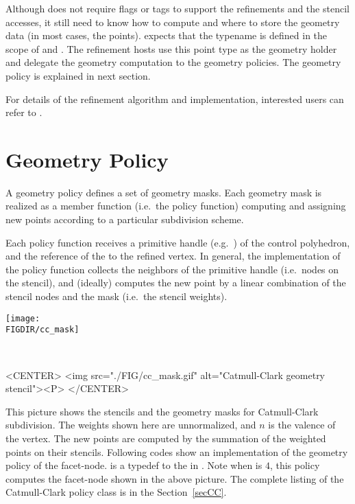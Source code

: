 Although  does not require flags or 
tags to support the refinements and the stencil accesses, it
still need to know how to compute and where to store the geometry
data (in most cases, the points).  
expects that the typename  is 
defined in the scope of  and . 
The refinement hosts use
this point type as the geometry holder and delegate the geometry
computation to the geometry policies. The geometry policy is 
explained in next section. 

For details of the refinement algorithm and implementation, 
interested users can refer to \cite{cgal:sp-mrbee-05}.

\section{Geometry Policy}
A geometry policy defines a set of geometry masks. 
Each geometry mask is realized as a member function (i.e.~the 
policy function) computing and assigning new points according 
to a particular subdivision scheme. 

Each policy function receives a primitive handle 
(e.g.~) of the control polyhedron, 
and the reference of the  to the refined vertex. 
In general, the implementation of the policy function 
collects the neighbors of the primitive handle (i.e.~nodes 
on the stencil), and (ideally) computes the new point 
by a linear combination of the stencil 
nodes and the mask (i.e.~the stencil weights).

\begin{ccTexOnly}
  \begin{center}
    \parbox{0.4\textwidth}{%
      \texttt{[image: \\FIGDIR/cc\_mask]}%
    } \\ \vspace{0.5cm}
  \end{center}
\end{ccTexOnly}
\begin{ccHtmlOnly}
  <CENTER>
     <img src="./FIG/cc_mask.gif" alt="Catmull-Clark geometry stencil"><P>
  </CENTER>
\end{ccHtmlOnly}

This picture shows the stencils and the geometry masks for
Catmull-Clark subdivision. The weights shown here are unnormalized, 
and $n$ is the valence of the vertex. The new points are 
computed by the summation of the weighted points on their stencils.
Following codes show an implementation of the geometry policy of 
the facet-node.  is a typedef to the 
in . Note when  is $4$, this policy computes 
the facet-node shown in the above picture. The complete listing
of the Catmull-Clark policy class is in the Section~\ref{secCC}.

